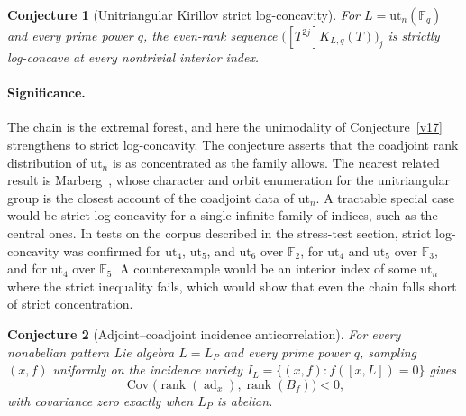 \documentclass[11pt]{article}
\newtheorem{conjecture}{Conjecture}
\theoremstyle{definition}
\newcommand{\rank}{\operatorname{rank}}
\newcommand{\Fq}{\mathbb F}
\begin{document}
\begin{conjecture}[Unitriangular Kirillov strict log-concavity]\label{v19}
For $L=\mathrm{ut}_n(\Fq_q)$ and every prime power $q$, the even-rank sequence $\bigl([T^{2j}]K_{L,q}(T)\bigr)_j$ is strictly log-concave at every nontrivial interior index.
\end{conjecture}

\paragraph{Significance.}
The chain is the extremal forest, and here the unimodality of Conjecture~\ref{v17} strengthens to strict log-concavity.  The conjecture asserts that the coadjoint rank distribution of $\mathrm{ut}_n$ is as concentrated as the family allows.  The nearest related result is Marberg~\cite{Mar}, whose character and orbit enumeration for the unitriangular group is the closest account of the coadjoint data of $\mathrm{ut}_n$.  A tractable special case would be strict log-concavity for a single infinite family of indices, such as the central ones.  In tests on the corpus described in the stress-test section, strict log-concavity was confirmed for $\mathrm{ut}_4$, $\mathrm{ut}_5$, and $\mathrm{ut}_6$ over $\Fq_2$, for $\mathrm{ut}_4$ and $\mathrm{ut}_5$ over $\Fq_3$, and for $\mathrm{ut}_4$ over $\Fq_5$.  A counterexample would be an interior index of some $\mathrm{ut}_n$ where the strict inequality fails, which would show that even the chain falls short of strict concentration.

\begin{conjecture}[Adjoint--coadjoint incidence anticorrelation]\label{v20}
For every nonabelian pattern Lie algebra $L=L_P$ and every prime power $q$, sampling $(x,f)$ uniformly on the incidence variety $I_L=\{(x,f):f([x,L])=0\}$ gives
\[
\operatorname{Cov}\bigl(\rank(\operatorname{ad}_x),\rank(B_f)\bigr)<0,
\]
with covariance zero exactly when $L_P$ is abelian.
\end{conjecture}
\end{document}
